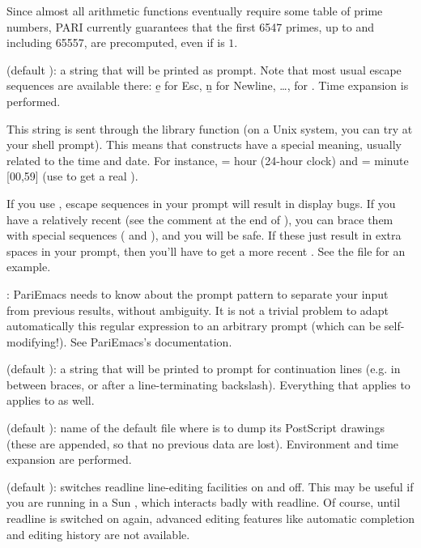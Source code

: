 Since almost all arithmetic functions eventually require some table of prime
numbers, PARI currently guarantees that the first 6547 primes, up to and
including 65557, are precomputed, even if  is $1$.

 (default ): a string that will be printed as
prompt. Note that most usual escape sequences are available there: \b{e} for
Esc, \b{n} for Newline, \dots, \kbd{\bs\bs} for \kbd{\bs}. Time expansion is
performed.

This string is sent through the library function  (on a
Unix system, you can try  at your shell prompt). This means
that \kbd{\%} constructs have a special meaning, usually related to the time
and date. For instance,  = hour (24-hour clock) and  =
minute [00,59] (use \kbd{\%\%} to get a real \kbd{\%}).

If you use , escape sequences in your prompt will result in
display bugs. If you have a relatively recent  (see the comment
at the end of ), you can brace them with special sequences
(\kbd{\bs[} and \kbd{\bs]}), and you will be safe. If these just result in
extra spaces in your prompt, then you'll have to get a more recent
. See the file  for an example.

: PariEmacs needs to know about the prompt pattern to
separate your input from previous  results, without ambiguity. It is
not a trivial problem to adapt automatically this regular expression to an
arbitrary prompt (which can be self-modifying!). See PariEmacs's
documentation.

 (default ): a string that will be printed
to prompt for continuation lines (e.g. in between braces, or after a
line-terminating backslash). Everything that applies to 
applies to  as well.

 (default ): name of the default file where
 is to dump its PostScript drawings (these are appended, so that no
previous data are lost). Environment and time expansion are performed.

 (default ): switches readline line-editing
facilities on and off. This may be useful if you are running  in a Sun
, which interacts badly with readline. Of course, until readline
is switched on again, advanced editing features like automatic completion
and editing history are not available.

